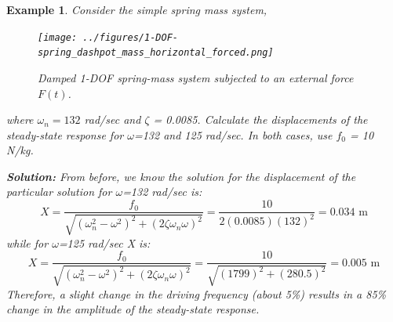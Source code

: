 \documentclass[12pt,letter]{article}
\newtheorem{ex}{Example}
\numberwithin{ex}{section} %
\newenvironment{example}{\begin{mdframed}[middlelinewidth=0.5mm]\begin{ex}\normalfont}{\end{ex}\end{mdframed}}
\numberwithin{re}{section} %
\numberwithin{pr}{section} %
\begin{document}
			
			
\begin{example}

			Consider the simple spring mass system, 
			\begin{figure}[H]
				\centering
				\texttt{[image: ../figures/1-DOF-spring\_dashpot\_mass\_horizontal\_forced.png]}
				\caption{Damped 1-DOF spring-mass system subjected to an external force $F(t)$.}
			\end{figure}				
			\noindent where $\omega_n = 132$ rad/sec and $\zeta$ = 0.0085. Calculate the displacements of the steady-state response for $\omega$=132 and 125 rad/sec. In both cases, use $f_0$ = 10 N/kg. 

			\noindent\textbf{Solution:}	From before, we know the solution for the displacement of the particular solution for $\omega$=132 rad/sec is:
			\begin{equation}
				X = \frac{f_0}{\sqrt{(\omega_n^2 - \omega^2)^2 +  (2\zeta \omega_n \omega)^2}} = \frac{10}{2(0.0085)(132)^2} = 0.034 \text{ m}
			\end{equation}							
			while for $\omega$=125 rad/sec X is:
			\begin{equation}
				X = \frac{f_0}{\sqrt{(\omega_n^2 - \omega^2)^2 +  (2\zeta \omega_n \omega)^2}} = \frac{10}{\sqrt{(1799)^2 +  (280.5)^2}}  = 0.005 \text{ m}
			\end{equation}				
			Therefore, a slight change in the driving frequency (about 5\%) results in a 85\% change in the amplitude of the steady-state response. 
\end{example}
\end{document}
